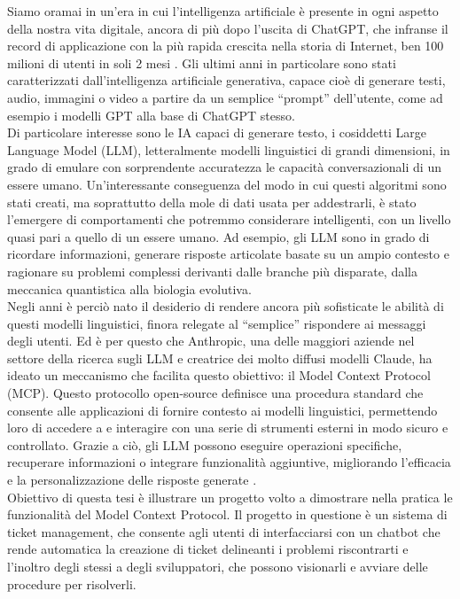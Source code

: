 ﻿Siamo oramai in un'era in cui l'intelligenza artificiale è presente in ogni aspetto della nostra vita digitale,
ancora di più dopo l'uscita di ChatGPT, che infranse il record di applicazione con la più rapida crescita nella storia di Internet,
ben 100 milioni di utenti in soli 2 mesi \cite{ubs2023latest}. Gli ultimi anni in particolare sono stati caratterizzati dall'intelligenza
artificiale generativa, capace cioè di generare testi, audio, immagini o video a partire da un semplice “prompt” dell'utente, come ad esempio i
modelli GPT alla base di ChatGPT stesso. \\
Di particolare interesse sono le IA capaci di generare testo, i cosiddetti Large Language Model (LLM), letteralmente modelli linguistici
di grandi dimensioni, in grado di emulare con sorprendente accuratezza le capacità conversazionali di un essere umano. Un'interessante
conseguenza del modo in cui questi algoritmi sono stati creati, ma soprattutto della mole di dati usata per addestrarli, è stato l'emergere
di comportamenti che potremmo considerare intelligenti, con un livello quasi pari a quello di un essere umano. Ad esempio, gli LLM sono
in grado di ricordare informazioni, generare risposte articolate basate su un ampio contesto e ragionare su problemi complessi derivanti
dalle branche più disparate, dalla meccanica quantistica alla biologia evolutiva. \\
Negli anni è perciò nato il desiderio di rendere ancora più sofisticate le abilità di questi modelli linguistici, finora relegate al
“semplice” rispondere ai messaggi degli utenti. Ed è per questo che Anthropic, una delle maggiori aziende nel settore della ricerca sugli LLM
e creatrice dei molto diffusi modelli Claude, ha ideato un meccanismo che facilita questo obiettivo: il Model Context Protocol (MCP).
Questo protocollo open-source definisce una procedura standard che consente alle applicazioni di fornire contesto ai modelli linguistici,
permettendo loro di accedere a e interagire con una serie di strumenti esterni in modo sicuro e controllato. Grazie a ciò, gli LLM possono
eseguire operazioni specifiche, recuperare informazioni o integrare funzionalità aggiuntive, migliorando l'efficacia e la personalizzazione
delle risposte generate \cite{modelcontextprotocol2024}. \\
Obiettivo di questa tesi è illustrare un progetto volto a dimostrare nella pratica le funzionalità del Model Context Protocol. Il progetto
in questione è un sistema di ticket management, che consente agli utenti di interfacciarsi con un chatbot che rende automatica la creazione
di ticket delineanti i problemi riscontrarti e l'inoltro degli stessi a degli sviluppatori, che possono visionarli e avviare delle procedure
per risolverli.
